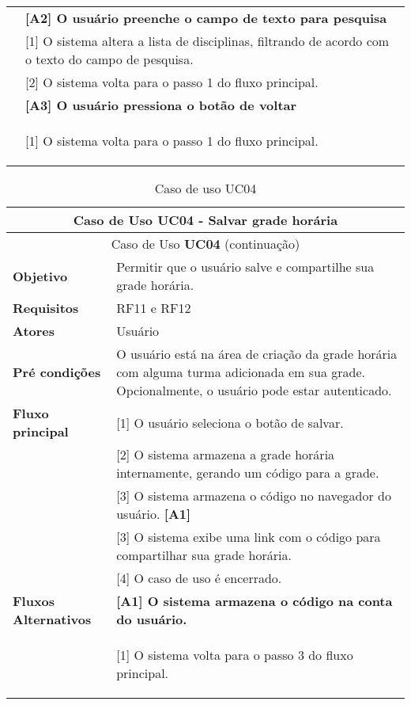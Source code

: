 \begin{longtable}{ | m{} | m{} | }
    & \textbf{[A2] O usuário preenche o campo de texto para pesquisa}\tabularnewline\cline{2-2}
    & [1] O sistema altera a lista de disciplinas, filtrando de acordo com o texto do campo de pesquisa. \tabularnewline\cline{2-2}
    & [2] O sistema volta para o passo 1 do fluxo principal. \tabularnewline\cline{2-2}

    & \textbf{[A3] O usuário pressiona o botão de voltar}\tabularnewline\cline{2-2}
    & [1] O sistema volta para o passo 1 do fluxo principal. %

    \label{tab:uc03}
\end{longtable}


\begin{longtable}{ | m{} | m{} | }
    
    \hline\hline
    
    \multicolumn{2}{|c|}{Caso de Uso \textbf{UC04} - Salvar grade horária}\tabularnewline\hline\hline
    \endfirsthead

    \hline\hline
    \multicolumn{2}{|c|}{Caso de Uso \textbf{UC04} (continuação)}\tabularnewline\hline\hline
    \endhead

    \hline
    \endfoot

    \hline
    \caption{Caso de uso UC04}
    \endlastfoot

    \textbf{Objetivo} & Permitir que o usuário salve e compartilhe sua grade horária.\tabularnewline\hline
    
    \textbf{Requisitos} & RF11 e RF12\tabularnewline\hline

    \textbf{Atores} & Usuário\tabularnewline\hline

    \textbf{Pré condições} & O usuário está na área de criação da grade horária com alguma turma adicionada em sua grade. Opcionalmente, o usuário pode estar autenticado.\tabularnewline\hline

    \multirow{1}{*}{\textbf{Fluxo principal}} & [1] O usuário seleciona o botão de salvar.\tabularnewline\cline{2-2}
    & [2] O sistema armazena a grade horária internamente, gerando um código para a grade.\tabularnewline\cline{2-2}
    & [3] O sistema armazena o código no navegador do usuário. \textbf{[A1]} \tabularnewline\cline{2-2}
    & [3] O sistema exibe uma link com o código para compartilhar sua grade horária.\tabularnewline\cline{2-2}
    & [4] O caso de uso é encerrado.\tabularnewline\hline

    \multirow{1}{*}{\textbf{Fluxos Alternativos}} & \textbf{[A1] O sistema armazena o código na conta do usuário.}\tabularnewline\cline{2-2}
    & [1] O sistema volta para o passo 3 do fluxo principal. %

    \label{tab:uc04}
\end{longtable}